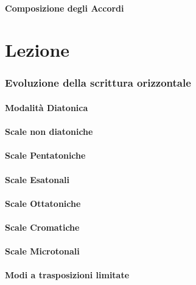 \documentclass[\printmode,compress,xcolor=dvipsnames]{beamer}
\begin{document}
\subsection[Comp. Accordi]{Composizione degli Accordi}

\part{Lezione }
\section[Melodia]{Evoluzione della scrittura orizzontale}
\subsection[Modi Diat.]{Modalit\`a Diatonica}
\subsection[Scale non-diat.]{Scale non diatoniche}
\subsection[Pentatoniche]{Scale Pentatoniche}
\subsection[Esatonali]{Scale Esatonali}
\subsection[Ottatoniche]{Scale Ottatoniche}
\subsection[Chromatiche]{Scale Cromatiche}
\subsection[Microtonali]{Scale Microtonali}
\subsection[Transpos. Lim.]{Modi a trasposizioni limitate}
%
\end{document}
